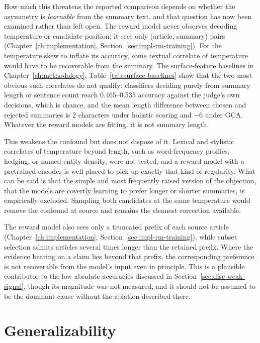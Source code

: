 How much this threatens the reported comparison depends on whether the
asymmetry is \emph{learnable} from the summary text, and that question has now
been examined rather than left open. The reward model never observes decoding
temperature or candidate position; it sees only (article, summary) pairs
(Chapter~\ref{ch:implementation}, Section~\ref{sec:impl-rm-training}). For the
temperature skew to inflate its accuracy, some textual correlate of temperature
would have to be recoverable from the summary. The surface-feature baselines in
Chapter~\ref{ch:methodology}, Table~\ref{tab:surface-baselines} show that the
two most obvious such correlates do not qualify: classifiers deciding purely
from summary length or sentence count reach 0.465--0.535 accuracy against the
judge's own decisions, which is chance, and the mean length difference between
chosen and rejected summaries is 2 characters under holistic scoring and $-6$
under GCA. Whatever the reward models are fitting, it is not summary length.

This weakens the confound but does not dispose of it. Lexical and stylistic
correlates of temperature beyond length, such as word-frequency profiles, hedging, or
named-entity density, were not tested, and a reward model with a
pretrained encoder is well placed to pick up exactly that kind of regularity.
What can be said is that the simple and most frequently raised version of the
objection, that the models are covertly learning to prefer longer or shorter
summaries, is empirically excluded. Sampling both candidates at the same
temperature would remove the confound at source and remains the cleanest
correction available.

The reward model also sees only a truncated prefix of each source article
(Chapter~\ref{ch:implementation}, Section~\ref{sec:impl-rm-training}), while
subset selection admits articles several times longer than the retained prefix.
Where the evidence bearing on a claim lies beyond that prefix, the corresponding
preference is not recoverable from the model's input even in principle. This is a
plausible contributor to the low absolute accuracies discussed in
Section~\ref{sec:disc-weak-signal}, though its magnitude was not measured, and it
should not be assumed to be the dominant cause without the ablation described
there.

\section{Generalizability}
\label{sec:disc-generalizability}

